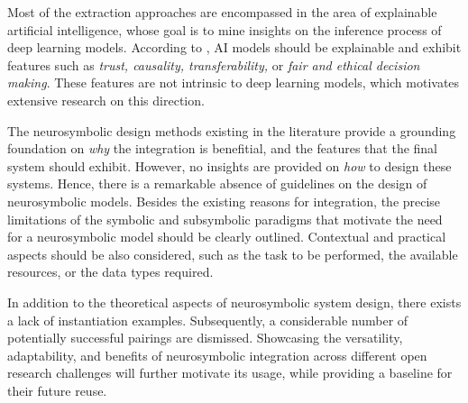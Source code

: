 Most of the extraction approaches are encompassed in the area of explainable artificial intelligence, whose goal is to mine insights on the inference process of deep learning models. According to \cite{burkart_survey_2021}, AI models should be explainable and exhibit features such as \textit{trust, causality, transferability,} or \textit{fair and ethical decision making}. These features are not intrinsic to deep learning models, which motivates extensive research on this direction.

The neurosymbolic design methods existing in the literature provide a grounding foundation on \textit{why} the integration is benefitial, and the features that the final system should exhibit. However, no insights are provided on \textit{how} to design these systems. Hence, there is a remarkable absence of guidelines on the design of neurosymbolic models. Besides the existing reasons for integration, the precise limitations of the symbolic and subsymbolic paradigms that motivate the need for a neurosymbolic model should be clearly outlined. Contextual and practical aspects should be also considered, such as the task to be performed, the available resources, or the data types required.

In addition to the theoretical aspects of neurosymbolic system design, there exists a lack of instantiation examples. Subsequently, a considerable number of potentially successful pairings are dismissed. Showcasing the versatility, adaptability, and benefits of neurosymbolic integration across different open research challenges will further motivate its usage, while providing a baseline for their future reuse. 


